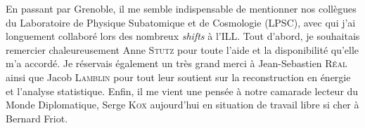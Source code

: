 En passant par Grenoble, il me semble indispensable de mentionner nos collègues du Laboratoire de Physique Subatomique et de Cosmologie (LPSC), avec qui j'ai longuement collaboré lors des nombreux \textit{shifts} à l'ILL. Tout d'abord, je souhaitais remercier chaleureusement Anne \textsc{Stutz} pour toute l'aide et la disponibilité qu'elle m'a accordé. Je réservais également un très grand merci à Jean-Sebastien \textsc{Réal} ainsi que Jacob \textsc{Lamblin} pour tout leur soutient sur la reconstruction en énergie et l'analyse statistique. Enfin, il me vient une pensée à notre camarade lecteur du Monde Diplomatique, Serge \textsc{Kox} aujourd'hui en situation de travail \og libre \fg{} si cher à Bernard Friot.\\
















